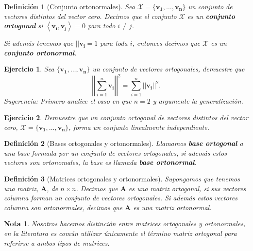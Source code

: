 \documentclass[11pt]{report}
\theoremstyle{break}
\newtheorem{definicion}{Definición}[chapter]
\newtheorem{nota}{Nota}[chapter]
\newtheorem{ejercicio}{Ejercicio}[chapter]
\theoremstyle{break}
\newcommand{\mbb}[1]{$\mathbb{#1}$}
\newcommand{\matdim}[2]{$#1 \times #2$}
\begin{document}
\begin{definicion}[Conjunto ortonormales]
Sea $\mathcal{X} = \{\bm{v_1}, \ldots, \bm{v_n} \}$ un conjunto de vectores distintos del vector cero. Decimos que el conjunto $\mathcal{X}$ es un \textbf{conjunto ortogonal} si $\left< \bm{v_i}, \bm{v_j} \right> = 0$ para todo $i \neq j$.

Si además tenemos que $||\bm{v_i} = 1$ para toda $i$, entonces decimos que $\mathcal{X}$ es un \textbf{conjunto ortonormal}.
\end{definicion}

\begin{ejercicio}
Sea $\{\bm{v_1}, \ldots, \bm{v_n} \}$ un conjunto de vectores ortogonales, demuestre que
$$ \left| \left| \sum_{i = 1}^{n} \bm{v_i} \right| \right|^{2} = \sum_{i = 1}^{n}||\bm{v_i}||^{2}.$$
Sugerencia: Primero analice el caso en que $n = 2$ y argumente la generalización.
\end{ejercicio}

\begin{ejercicio}
Demuestre que un conjunto ortogonal de vectores distintos del vector cero, $\mathcal{X} = \{\bm{v_1}, \ldots, \bm{v_n} \}$, forma un conjunto linealmente independiente.\newline
\end{ejercicio}

\begin{definicion}[Bases ortogonales y ortonormales]
Llamamos \textbf{base ortogonal} a una base formada por un conjunto de vectores ortogonales, si además estos vectores son ortonomales, la base es llamada \textbf{base ortonormal}.
\end{definicion}

\begin{definicion}[Matrices ortogonales y ortonormales]
\label{definicion:matriz-ortogonal}
Supongamos que tenemos una matriz, $\bm{A}$, de \matdim{n}{n}. Decimos que $\bm{A}$ es una matriz ortogonal, si sus vectores columna forman un conjunto de vectores ortogonales.
Si además estos vectores columna son ortonormales, decimos que $\bm{A}$ es una matriz ortonormal.
\end{definicion}

\begin{nota}
\label{nota:Matrices-ortonormales}
Nosotros hacemos distinción entre matrices ortogonales y ortonormales, en la literatura es común utilizar únicamente el término matriz ortogonal para referirse a ambos tipos de matrices.
\end{nota}
\end{document}
